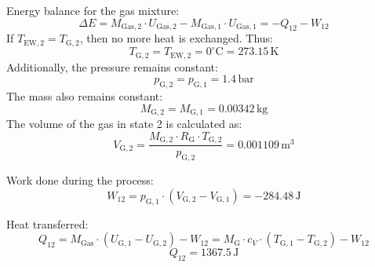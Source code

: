 Energy balance for the gas mixture:  
\[
\Delta E = M_{\text{Gas},2} \cdot U_{\text{Gas},2} - M_{\text{Gas},1} \cdot U_{\text{Gas},1} = -Q_{12} - W_{12}
\]  
If \( T_{\text{EW},2} = T_{\text{G},2} \), then no more heat is exchanged.  
Thus:  
\[
T_{\text{G},2} = T_{\text{EW},2} = 0^\circ\text{C} = 273.15 \, \text{K}
\]  
Additionally, the pressure remains constant:  
\[
p_{\text{G},2} = p_{\text{G},1} = 1.4 \, \text{bar}
\]  
The mass also remains constant:  
\[
M_{\text{G},2} = M_{\text{G},1} = 0.00342 \, \text{kg}
\]  
The volume of the gas in state 2 is calculated as:  
\[
V_{\text{G},2} = \frac{M_{\text{G},2} \cdot R_{\text{G}} \cdot T_{\text{G},2}}{p_{\text{G},2}} = 0.001109 \, \text{m}^3
\]  

Work done during the process:  
\[
W_{12} = p_{\text{G},1} \cdot (V_{\text{G},2} - V_{\text{G},1}) = -284.48 \, \text{J}
\]  

Heat transferred:  
\[
Q_{12} = M_{\text{Gas}} \cdot (U_{\text{G},1} - U_{\text{G},2}) - W_{12} = M_{\text{G}} \cdot c_V \cdot (T_{\text{G},1} - T_{\text{G},2}) - W_{12}
\]  
\[
Q_{12} = 1367.5 \, \text{J}
\]